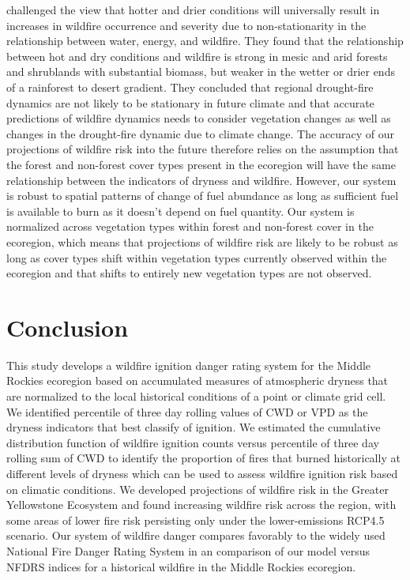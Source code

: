 \documentclass[11p]{article}
\begin{document}
\citet{mckenzieClimateChangeEcohydrology2017} challenged the view that hotter and drier conditions will universally result in increases in wildfire occurrence and severity due to non-stationarity in the relationship between water, energy, and wildfire. They found that the relationship between hot and dry conditions and wildfire is strong in mesic and arid forests and shrublands with substantial biomass, but weaker in the wetter or drier ends of a rainforest to desert gradient. They concluded that regional drought-fire dynamics are not likely to be stationary in future climate and that accurate predictions of wildfire dynamics needs to consider vegetation changes  as well as changes in the drought-fire dynamic due to climate change. The accuracy of our projections of wildfire risk into the future therefore relies on the assumption that the forest and non-forest cover types present in the ecoregion will have the same relationship between the indicators of dryness and wildfire. However, our system is robust to spatial patterns of change of fuel abundance as long as sufficient fuel is available to burn as it doesn't depend on fuel quantity. Our system is normalized across vegetation types within forest and non-forest cover in the ecoregion, which means that projections of wildfire risk are likely to be robust as long as cover types shift within vegetation types currently observed within the ecoregion and that shifts to entirely new vegetation types are not observed.

\section{Conclusion}

This study develops a wildfire ignition danger rating system for the Middle Rockies ecoregion based on accumulated measures of atmospheric dryness that are normalized to the local historical conditions of a point or climate grid cell. We identified percentile of three day rolling values of CWD or VPD as the dryness indicators that best classify of ignition. We estimated the cumulative distribution function of wildfire ignition counts versus percentile of three day rolling sum of CWD to identify the proportion of fires that burned historically at different levels of dryness which can be used to assess wildfire ignition risk based on climatic conditions. We developed projections of wildfire risk in the Greater Yellowstone Ecosystem and found increasing wildfire risk across the region, with some areas of lower fire risk persisting only under the lower-emissions RCP4.5 scenario. Our system of wildfire danger compares favorably to the widely used National Fire Danger Rating System in an comparison of our model versus NFDRS indices for a historical wildfire in the Middle Rockies ecoregion.
\end{document}

